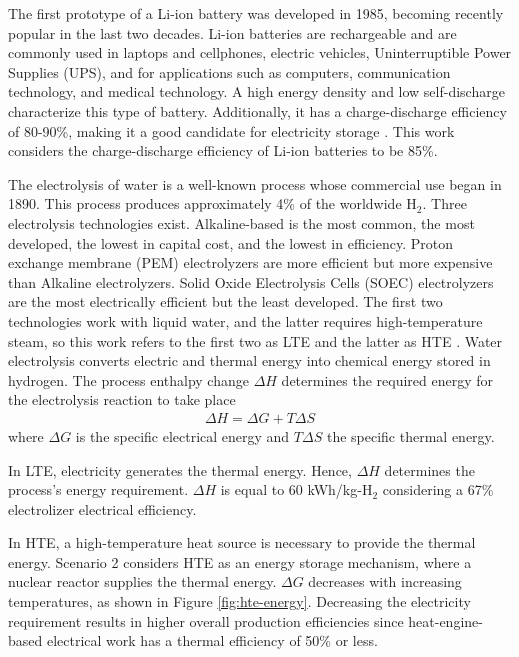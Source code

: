 \documentclass{anstrans}
\begin{document}
The first prototype of a Li-ion battery was developed in 1985, becoming recently popular in the last two decades.
Li-ion batteries are rechargeable and are commonly used in laptops and cellphones, electric vehicles, Uninterruptible Power Supplies (UPS), and for applications such as computers, communication technology, and medical technology.
A high energy density and low self-discharge characterize this type of battery.
Additionally, it has a charge-discharge efficiency of 80-90\%, making it a good candidate for electricity storage \cite{sun_car_2010}.
This work considers the charge-discharge efficiency of Li-ion batteries to be 85\%.

The electrolysis of water is a well-known process whose commercial use began in 1890.
This process produces approximately 4\% of the worldwide H$_2$.
Three electrolysis technologies exist.
Alkaline-based is the most common, the most developed, the lowest in capital cost, and the lowest in efficiency.
Proton exchange membrane (PEM) electrolyzers are more efficient but more expensive than Alkaline electrolyzers.
Solid Oxide Electrolysis Cells (SOEC) electrolyzers are the most electrically efficient but the least developed.
The first two technologies work with liquid water, and the latter requires high-temperature steam, so this work refers to the first two as \gls{LTE} and the latter as \gls{HTE} \cite{fairhurst-agosta_multi-physics_2020}.
Water electrolysis converts electric and thermal energy into chemical energy stored in hydrogen.
The process enthalpy change $\Delta H$ determines the required energy for the electrolysis reaction to take place
\begin{align}
  \Delta H = \Delta G + T \Delta S
\end{align}
where $\Delta G$ is the specific electrical energy and $T \Delta S$ the specific thermal energy.

In LTE, electricity generates the thermal energy.
Hence, $\Delta H$ determines the process’s energy requirement.
$\Delta H$ is equal to 60 kWh/kg-H$_2$ considering a 67\% electrolizer electrical efficiency.

In HTE, a high-temperature heat source is necessary to provide the thermal energy.
Scenario 2 considers HTE as an energy storage mechanism, where a nuclear reactor supplies the thermal energy.
$\Delta G$ decreases with increasing temperatures, as shown in Figure \ref{fig:hte-energy}.
Decreasing the electricity requirement results in higher overall production efficiencies since heat-engine-based electrical work has a thermal efficiency of 50\% or less.
\end{document}
